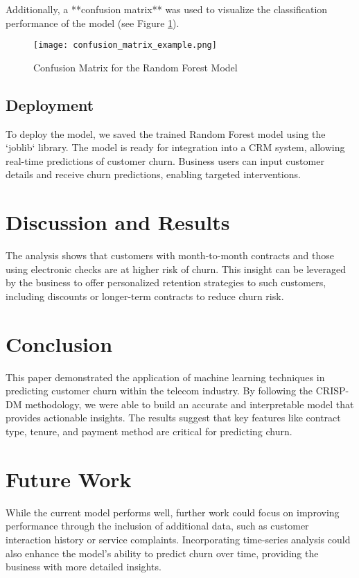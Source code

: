 \documentclass[12pt]{article}
\begin{document}
Additionally, a **confusion matrix** was used to visualize the classification performance of the model (see Figure \ref{fig:confusion_matrix}).

\begin{figure}[H]
    \centering
    \texttt{[image: confusion\_matrix\_example.png]}
    \caption{Confusion Matrix for the Random Forest Model}
    \label{fig:confusion_matrix}
\end{figure}

\subsection{Deployment}
To deploy the model, we saved the trained Random Forest model using the `joblib` library. The model is ready for integration into a CRM system, allowing real-time predictions of customer churn. Business users can input customer details and receive churn predictions, enabling targeted interventions.

\section{Discussion and Results}
The analysis shows that customers with month-to-month contracts and those using electronic checks are at higher risk of churn. This insight can be leveraged by the business to offer personalized retention strategies to such customers, including discounts or longer-term contracts to reduce churn risk.

\section{Conclusion}
This paper demonstrated the application of machine learning techniques in predicting customer churn within the telecom industry. By following the CRISP-DM methodology, we were able to build an accurate and interpretable model that provides actionable insights. The results suggest that key features like contract type, tenure, and payment method are critical for predicting churn.

\section{Future Work}
While the current model performs well, further work could focus on improving performance through the inclusion of additional data, such as customer interaction history or service complaints. Incorporating time-series analysis could also enhance the model's ability to predict churn over time, providing the business with more detailed insights.
\end{document}

